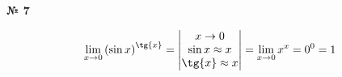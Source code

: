 \documentclass{article}
\begin{document}
\textbf{№ 7} 
\large

$$ \lim\limits_{x \to 0} \left( \sin{x} \right)^{\tg{x}}
= \begin{vmatrix} x \to 0 \\
                  \sin{x} \approx x \\
                  \tg{x} \approx x \end{vmatrix}
= \lim\limits_{x \to 0} x^x
= 0^0
= 1 $$
\end{document}
